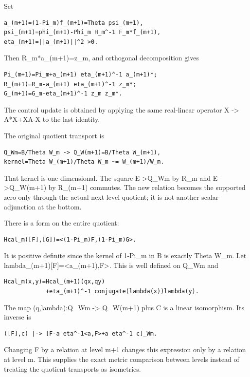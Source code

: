 Set

\begin{verbatim}
a_(m+1)=(1-Pi_m)f_(m+1)=Theta psi_(m+1),
psi_(m+1)=phi_(m+1)-Phi_m H_m^-1 F_m*f_(m+1),
eta_(m+1)=||a_(m+1)||^2 >0.
\end{verbatim}

Then R\_m*a\_(m+1)=z\_m, and orthogonal decomposition gives

\begin{verbatim}
Pi_(m+1)=Pi_m+a_(m+1) eta_(m+1)^-1 a_(m+1)*;
R_(m+1)=R_m-a_(m+1) eta_(m+1)^-1 z_m*;
G_(m+1)=G_m-eta_(m+1)^-1 z_m z_m*.
\end{verbatim}

The control update is obtained by applying the same real-linear operator X \textbar-\textgreater{}
A*X+XA-X to the last identity.

The original quotient transport is

\begin{verbatim}
Q_Wm=B/Theta W_m -> Q_W(m+1)=B/Theta W_(m+1),
kernel=Theta W_(m+1)/Theta W_m ~= W_(m+1)/W_m.
\end{verbatim}

That kernel is one-dimensional. The square E-\textgreater Q\_Wm by R\_m and E-\textgreater Q\_W(m+1)
by R\_(m+1) commutes. The new relation becomes the supported zero only through the actual next-level
quotient; it is not another scalar adjunction at the bottom.

There is a form on the entire quotient:

\begin{verbatim}
Hcal_m([F],[G])=<(1-Pi_m)F,(1-Pi_m)G>.
\end{verbatim}

It is positive definite since the kernel of 1-Pi\_m in B is exactly Theta W\_m. Let
lambda\_(m+1){[}F{]}=\textless a\_(m+1),F\textgreater. This is well defined on Q\_Wm and

\begin{verbatim}
Hcal_m(x,y)=Hcal_(m+1)(qx,qy)
            +eta_(m+1)^-1 conjugate(lambda(x))lambda(y).
\end{verbatim}

The map (q,lambda):Q\_Wm -\textgreater{} Q\_W(m+1) plus C is a linear isomorphism. Its inverse is

\begin{verbatim}
([F],c) |-> [F-a eta^-1<a,F>+a eta^-1 c]_Wm.
\end{verbatim}

Changing F by a relation at level m+1 changes this expression only by a relation at level m. This
supplies the exact metric comparison between levels instead of treating the quotient transports as
isometries.

